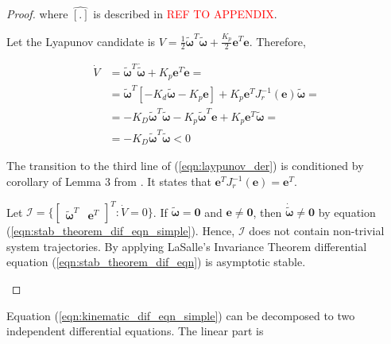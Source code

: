 \begin{proof}
    where $\hat{[.]}$ is described in \textcolor{red}{REF TO APPENDIX}.

    Let the Lyapunov candidate is $V = \frac{1}{2} 
    \tilde{\boldsymbol{\omega}}^T \tilde{\boldsymbol{\omega}} + 
    \frac{K_p}{2} \mathbf{e}^T \mathbf{e}
    $. Therefore, 

    \begin{equation}
        \begin{aligned}
            \dot{V} & = 
            \tilde{\boldsymbol{\omega}}^T \dot{\tilde{\boldsymbol{\omega}}}
            + K_p 
            \mathbf{e}^T \dot{\mathbf{e}} = \\
            & = \tilde{\boldsymbol{\omega}}^T [
                -K_d \tilde{\boldsymbol{\omega}} - K_p \mathbf{e}
            ] + K_p \mathbf{e}^T J_r^{-1}(\mathbf{e}) \tilde{\boldsymbol{\omega}} =\\
            & = -K_D \tilde{\boldsymbol{\omega}}^T \tilde{\boldsymbol{\omega}} 
            - K_p \tilde{\boldsymbol{\omega}}^T \mathbf{e} 
            + K_p \mathbf{e}^T \tilde{\boldsymbol{\omega}} = \\
            & = -K_D \tilde{\boldsymbol{\omega}}^T \tilde{\boldsymbol{\omega}} 
            < 0 
        \end{aligned}
        \label{eqn:laypunov_der}
    \end{equation}

    The transition to the third line of (\ref{eqn:laypunov_der}) is conditioned 
    by corollary of Lemma 3 from \cite{ANonlinearObserverUsingPose}. It states that 
    $\mathbf{e}^T J_r^{-1}(\mathbf{e}) = \mathbf{e}^T$.

    Let $\mathcal{I} = \{ \begin{bmatrix} \tilde{\boldsymbol{\omega}}^T & 
    \mathbf{e}^T \end{bmatrix}^T : \dot{V} = 0 \}$. If $\tilde{\boldsymbol{\omega}} 
    = \mathbf{0}$ and $\mathbf{e} \neq \mathbf{0}$, then 
    $\dot{\tilde{\boldsymbol{\omega}}} \neq \mathbf{0}$ by equation 
    (\ref{eqn:stab_theorem_dif_eqn_simple}). Hence, $\mathcal{I}$ does not contain 
    non-trivial system trajectories. By applying LaSalle's Invariance Theorem 
    differential equation (\ref{eqn:stab_theorem_dif_eqn}) is asymptotic stable.

    \label{pr:stability_theorem_proof}
\end{proof}

Equation (\ref{eqn:kinematic_dif_eqn_simple}) can be decomposed to two independent 
differential equations. The linear part is

